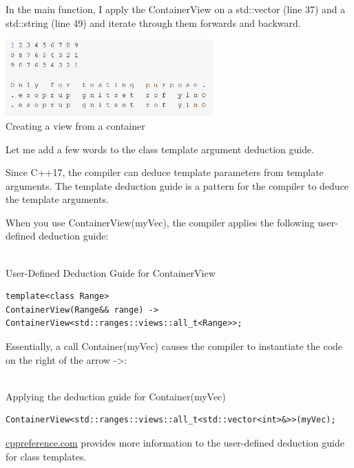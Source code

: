 In the main function, I apply the ContainerView on a std::vector (line 37) and a std::string (line 49) and iterate through them forwards and backward.

\begin{center}
\includegraphics[width=0.6\textwidth]{content/3/chapter5/images/1-3.png}\\
Creating a view from a container
\end{center}

Let me add a few words to the class template argument deduction guide.

\begin{tcolorbox}[breakable,enhanced jigsaw,colback=blue!5!white,colframe=blue!75!black,title={Class Template Argument Deduction Guide}]
Since C++17, the compiler can deduce template parameters from template arguments. The template deduction guide is a pattern for the compiler to deduce the template arguments.

When you use ContainerView(myVec), the compiler applies the following user-defined deduction guide:

\hspace*{\fill} \\ %
\noindent
User-Defined Deduction Guide for ContainerView
\begin{lstlisting}[style=styleCXX]
template<class Range>
ContainerView(Range&& range) -> ContainerView<std::ranges::views::all_t<Range>>;
\end{lstlisting}

Essentially, a call Container(myVec) causes the compiler to instantiate the code on the right of the arrow ->:

\hspace*{\fill} \\ %
\noindent
Applying the deduction guide for Container(myVec)
\begin{lstlisting}[style=styleCXX]
ContainerView<std::ranges::views::all_t<std::vector<int>&>>(myVec);
\end{lstlisting}

\href{https://en.cppreference.com/w/cpp/language/class_template_argument_deduction}{cppreference.com} provides more information to the user-defined deduction guide for class templates.
\end{tcolorbox}


